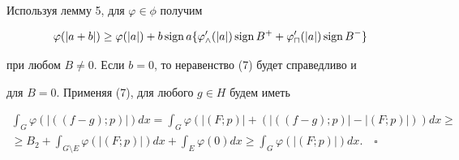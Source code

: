 Используя лемму 5, для $\varphi\in\phi$ получим 


\begin{equation} 


\varphi(|a+b|)\ge\varphi(|a|)+b\sign a 


\{\varphi'_\wedge(|a|)\sign B^+ +\varphi'_\sqcap(|a|) 


\sign B^-\} 


\end{equation} 


при любом $B\ne0$. Если $b=0$, то неравенство (7) будет справедливо и 


для $B=0$. Применяя (7), для любого $g\in H$ будем иметь 


\begin{multline*} 


\int_G \varphi(|((f-g);p)|)dx=\int_G \varphi(|(F;p)|+ 


(|((f-g);p)|-|(F;p)|))dx\ge \\ 


% 


\ge B_2+\int_{G\setminus E} \varphi(|(F;p)|)dx+ 


\int_E \varphi(0)dx\ge\int_G \varphi(|(F;p)|)dx.\quad\square 


\end{multline*} 


 


 


